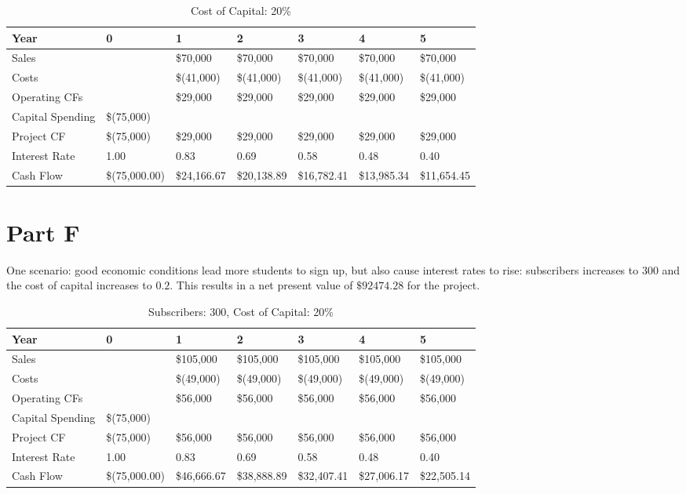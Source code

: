 \documentclass[12pt, letterpaper, parskip = full]{article}
\begin{document}
\begin{table}[!ht]
    \centering
    \caption{Cost of Capital: 20\%}
    \begin{tabularx}{\textwidth}{|X|X|X|X|X|X|X|}
    \hline
        Year & 0 & 1 & 2 & 3 & 4 & 5 \\ \hline
        Sales & ~ &  \$70,000  &  \$70,000  &  \$70,000  &  \$70,000  &  \$70,000  \\ \hline
        Costs & ~ &  \$(41,000) &  \$(41,000) &  \$(41,000) &  \$(41,000) &  \$(41,000) \\ \hline
        Operating CFs & ~ &  \$29,000  &  \$29,000  &  \$29,000  &  \$29,000  &  \$29,000  \\ \hline
        Capital Spending &  \$(75,000) & ~ & ~ & ~ & ~ & ~ \\ \hline
        Project CF &  \$(75,000) &  \$29,000  &  \$29,000  &  \$29,000  &  \$29,000  &  \$29,000  \\ \hline
        Interest Rate &  1.00  &  0.83  &  0.69  &  0.58  &  0.48  &  0.40  \\ \hline
        Cash Flow &  \$(75,000.00) &  \$24,166.67  &  \$20,138.89  &  \$16,782.41  &  \$13,985.34  &  \$11,654.45 \\ \hline
    \end{tabularx}
\end{table}

\section{Part F}

One scenario: good economic conditions lead more students to sign up, but also cause interest rates to rise: subscribers increases to \(300\) and the cost of capital increases to \(0.2\). This results in a net present value of \(\$92474.28\) for the project.

\begin{table}[!ht]
    \centering
    \caption{Subscribers: 300, Cost of Capital: 20\%}
    \begin{tabularx}{\textwidth}{|X|X|X|X|X|X|X|}
    \hline
        Year & 0 & 1 & 2 & 3 & 4 & 5 \\ \hline
        Sales & ~ &  \$105,000  &  \$105,000  &  \$105,000  &  \$105,000  &  \$105,000  \\ \hline
        Costs & ~ &  \$(49,000) &  \$(49,000) &  \$(49,000) &  \$(49,000) &  \$(49,000) \\ \hline
        Operating CFs & ~ &  \$56,000  &  \$56,000  &  \$56,000  &  \$56,000  &  \$56,000  \\ \hline
        Capital Spending &  \$(75,000) & ~ & ~ & ~ & ~ & ~ \\ \hline
        Project CF &  \$(75,000) &  \$56,000  &  \$56,000  &  \$56,000  &  \$56,000  &  \$56,000  \\ \hline
        Interest Rate &  1.00  &  0.83  &  0.69  &  0.58  &  0.48  &  0.40  \\ \hline
        Cash Flow &  \$(75,000.00) &  \$46,666.67  &  \$38,888.89  &  \$32,407.41  &  \$27,006.17  &  \$22,505.14 \\ \hline
    \end{tabularx}
\end{table}
\end{document}
